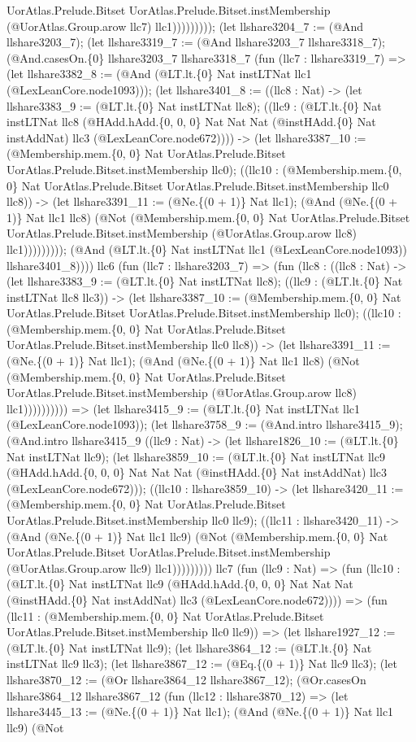 \documentclass[11pt]{article}
\begin{document}
UorAtlas.Prelude.Bitset UorAtlas.Prelude.Bitset.instMembership (@UorAtlas.Group.arow llc7) llc1))))))))); (let llshare3204\_7 := (@And llshare3203\_7); (let llshare3319\_7 := (@And llshare3203\_7 llshare3318\_7); (@And.casesOn.\{0\} llshare3203\_7 llshare3318\_7 (fun (llc7 : llshare3319\_7) => (let llshare3382\_8 := (@And (@LT.lt.\{0\} Nat instLTNat llc1 (@LexLeanCore.node1093))); (let llshare3401\_8 := ((llc8 : Nat) -> (let llshare3383\_9 := (@LT.lt.\{0\} Nat instLTNat llc8); ((llc9 : (@LT.lt.\{0\} Nat instLTNat llc8 (@HAdd.hAdd.\{0, 0, 0\} Nat Nat Nat (@instHAdd.\{0\} Nat instAddNat) llc3 (@LexLeanCore.node672)))) -> (let llshare3387\_10 := (@Membership.mem.\{0, 0\} Nat UorAtlas.Prelude.Bitset UorAtlas.Prelude.Bitset.instMembership llc0); ((llc10 : (@Membership.mem.\{0, 0\} Nat UorAtlas.Prelude.Bitset UorAtlas.Prelude.Bitset.instMembership llc0 llc8)) -> (let llshare3391\_11 := (@Ne.\{(0 + 1)\} Nat llc1); (@And (@Ne.\{(0 + 1)\} Nat llc1 llc8) (@Not (@Membership.mem.\{0, 0\} Nat UorAtlas.Prelude.Bitset UorAtlas.Prelude.Bitset.instMembership (@UorAtlas.Group.arow llc8) llc1))))))))); (@And (@LT.lt.\{0\} Nat instLTNat llc1 (@LexLeanCore.node1093)) llshare3401\_8)))) llc6 (fun (llc7 : llshare3203\_7) => (fun (llc8 : ((llc8 : Nat) -> (let llshare3383\_9 := (@LT.lt.\{0\} Nat instLTNat llc8); ((llc9 : (@LT.lt.\{0\} Nat instLTNat llc8 llc3)) -> (let llshare3387\_10 := (@Membership.mem.\{0, 0\} Nat UorAtlas.Prelude.Bitset UorAtlas.Prelude.Bitset.instMembership llc0); ((llc10 : (@Membership.mem.\{0, 0\} Nat UorAtlas.Prelude.Bitset UorAtlas.Prelude.Bitset.instMembership llc0 llc8)) -> (let llshare3391\_11 := (@Ne.\{(0 + 1)\} Nat llc1); (@And (@Ne.\{(0 + 1)\} Nat llc1 llc8) (@Not (@Membership.mem.\{0, 0\} Nat UorAtlas.Prelude.Bitset UorAtlas.Prelude.Bitset.instMembership (@UorAtlas.Group.arow llc8) llc1)))))))))) => (let llshare3415\_9 := (@LT.lt.\{0\} Nat instLTNat llc1 (@LexLeanCore.node1093)); (let llshare3758\_9 := (@And.intro llshare3415\_9); (@And.intro llshare3415\_9 ((llc9 : Nat) -> (let llshare1826\_10 := (@LT.lt.\{0\} Nat instLTNat llc9); (let llshare3859\_10 := (@LT.lt.\{0\} Nat instLTNat llc9 (@HAdd.hAdd.\{0, 0, 0\} Nat Nat Nat (@instHAdd.\{0\} Nat instAddNat) llc3 (@LexLeanCore.node672))); ((llc10 : llshare3859\_10) -> (let llshare3420\_11 := (@Membership.mem.\{0, 0\} Nat UorAtlas.Prelude.Bitset UorAtlas.Prelude.Bitset.instMembership llc0 llc9); ((llc11 : llshare3420\_11) -> (@And (@Ne.\{(0 + 1)\} Nat llc1 llc9) (@Not (@Membership.mem.\{0, 0\} Nat UorAtlas.Prelude.Bitset UorAtlas.Prelude.Bitset.instMembership (@UorAtlas.Group.arow llc9) llc1))))))))) llc7 (fun (llc9 : Nat) => (fun (llc10 : (@LT.lt.\{0\} Nat instLTNat llc9 (@HAdd.hAdd.\{0, 0, 0\} Nat Nat Nat (@instHAdd.\{0\} Nat instAddNat) llc3 (@LexLeanCore.node672)))) => (fun (llc11 : (@Membership.mem.\{0, 0\} Nat UorAtlas.Prelude.Bitset UorAtlas.Prelude.Bitset.instMembership llc0 llc9)) => (let llshare1927\_12 := (@LT.lt.\{0\} Nat instLTNat llc9); (let llshare3864\_12 := (@LT.lt.\{0\} Nat instLTNat llc9 llc3); (let llshare3867\_12 := (@Eq.\{(0 + 1)\} Nat llc9 llc3); (let llshare3870\_12 := (@Or llshare3864\_12 llshare3867\_12); (@Or.casesOn llshare3864\_12 llshare3867\_12 (fun (llc12 : llshare3870\_12) => (let llshare3445\_13 := (@Ne.\{(0 + 1)\} Nat llc1); (@And (@Ne.\{(0 + 1)\} Nat llc1 llc9) (@Not 
\end{document}
